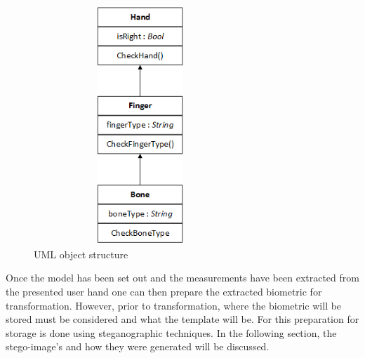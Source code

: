     
    \begin{figure}[htbp!] 
    \centering    
    \includegraphics[width=8cm,height=9cm,keepaspectratio]{Chapter3/Figs/Object_Diagram.png}
    \caption[UML object structure]{UML object structure}
    \label{fig:UML object structure}
    \end{figure}

Once the model has been set out and the measurements have been extracted from the presented user hand one can then prepare the extracted biometric for transformation. However, prior to transformation, where the biometric will be stored must be considered and what the template will be. For this preparation for storage is done using steganographic techniques. In the following section, the stego-image’s and how they were generated will be discussed.






